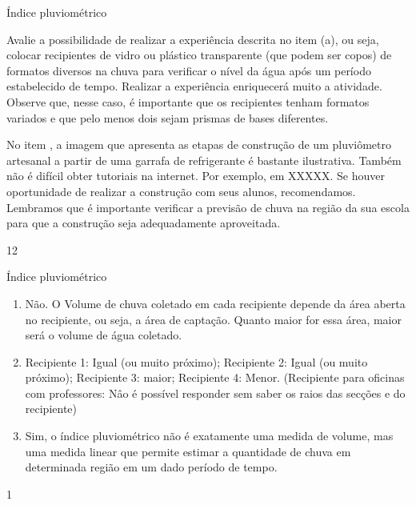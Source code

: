 \begin{sugestions}{Índice pluviométrico}
{
Avalie a possibilidade de realizar a experiência descrita no item (a), ou seja, colocar recipientes de vidro ou plástico transparente (que podem ser copos) de formatos diversos na chuva para verificar o nível da água após um período estabelecido de tempo. Realizar a experiência enriquecerá muito a atividade. Observe que, nesse caso, é importante que os recipientes tenham formatos variados e que pelo menos dois sejam prismas de bases diferentes.

No item , a imagem que apresenta as etapas de construção de um pluviômetro artesanal a partir de uma garrafa de refrigerante é bastante ilustrativa. Também não é difícil obter tutoriais na internet. Por exemplo, em XXXXX. Se houver oportunidade de realizar a construção com seus alunos, recomendamos. Lembramos que é importante verificar a previsão de chuva na região da sua escola para que a construção seja adequadamente aproveitada.
}{1}{2}
\end{sugestions}
\clearmargin
\begin{answer}{Índice pluviométrico}
{
\begin{enumerate}
\item {} 
Não. O Volume de chuva coletado em cada recipiente depende da área aberta no recipiente, ou seja, a área de captação. Quanto maior for essa área, maior será o volume de água coletado.

\item {} 
Recipiente 1: Igual (ou muito próximo); Recipiente 2: Igual (ou muito próximo); Recipiente 3: maior; Recipiente 4: Menor. (Recipiente para oficinas com professores:  Nâo é possível responder sem saber os raios das secções e do recipiente)

\item {} 
Sim, o índice pluviométrico não é exatamente uma medida de volume, mas uma medida linear que permite estimar a quantidade de chuva em determinada região em um dado período de tempo.
\end{enumerate}
}{1}
\end{answer}
\clearmargin
